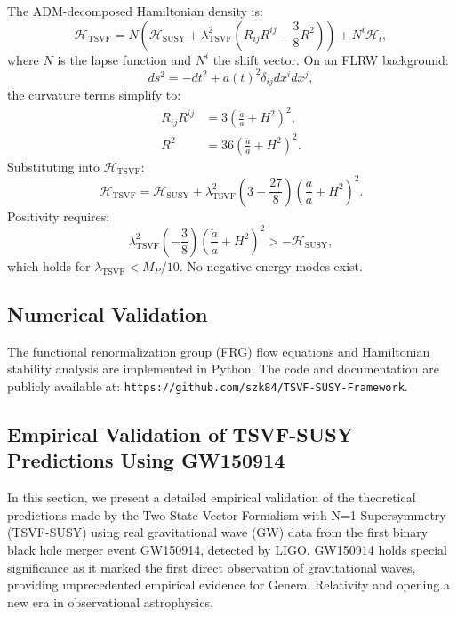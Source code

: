 \documentclass[twocolumn,superscriptaddress,floatfix]{revtex4-2}
\begin{document}
The ADM-decomposed Hamiltonian density is:
\begin{equation}
\mathcal{H}_{\text{TSVF}} = N\left(\mathcal{H}_{\text{SUSY}} + \lambda_{\text{TSVF}}^2\left(R_{ij}R^{ij} - \frac{3}{8}R^2\right)\right) + N^i\mathcal{H}_i,
\end{equation}
where \(N\) is the lapse function and \(N^i\) the shift vector. On an FLRW background:
\begin{equation}
ds^2 = -dt^2 + a(t)^2\delta_{ij}dx^i dx^j,
\end{equation}
the curvature terms simplify to:
\begin{align}
R_{ij}R^{ij} &= 3\left(\frac{\ddot{a}}{a} + H^2\right)^2, \\
R^2 &= 36\left(\frac{\ddot{a}}{a} + H^2\right)^2.
\end{align}
Substituting into \(\mathcal{H}_{\text{TSVF}}\):
\begin{equation}
\mathcal{H}_{\text{TSVF}} = \mathcal{H}_{\text{SUSY}} + \lambda_{\text{TSVF}}^2\left(3 - \frac{27}{8}\right)\left(\frac{\ddot{a}}{a} + H^2\right)^2.
\end{equation}
Positivity requires:
\begin{equation}
\lambda_{\text{TSVF}}^2\left(-\frac{3}{8}\right)\left(\frac{\ddot{a}}{a} + H^2\right)^2 > -\mathcal{H}_{\text{SUSY}},
\end{equation}
which holds for \(\lambda_{\text{TSVF}} < M_P/10\). No negative-energy modes exist.


\subsection{Numerical Validation}
\label{app:numerics}

The functional renormalization group (FRG) flow equations and Hamiltonian stability analysis are implemented in Python. The code and documentation are publicly available at:  
\texttt{https://github.com/szk84/TSVF-SUSY-Framework}.  

\subsection{Empirical Validation of TSVF-SUSY Predictions Using GW150914}\label{sec:empirical_validation_gw150914}

In this section, we present a detailed empirical validation of the theoretical predictions made by the Two-State Vector Formalism with N=1 Supersymmetry (TSVF-SUSY) using real gravitational wave (GW) data from the first binary black hole merger event GW150914, detected by LIGO. GW150914 holds special significance as it marked the first direct observation of gravitational waves, providing unprecedented empirical evidence for General Relativity and opening a new era in observational astrophysics.
\end{document}
